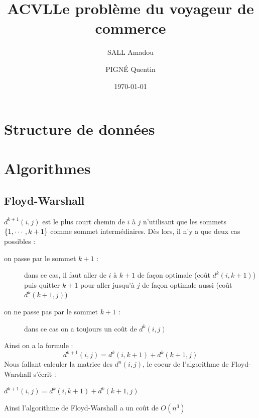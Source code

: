 \documentclass[11pt]{article} \usepackage[top=2cm, bottom=2cm, left=2cm, right=2cm]{geometry}
\title{ACVL} \title{Le problème du voyageur de commerce} \author{SALL Amadou \and PIGN\'E Quentin } \date{\today}
\begin{document}
\maketitle

\section{Structure de données}
\section{Algorithmes}

\subsection*{Floyd-Warshall}
$d^{k+1}(i,j)$ est le plus court chemin de $i$ à $j$ n'utilisant que les sommets $\left\{1,\cdots,k+1\right\}$ comme sommet
intermédiaires. Dès lors, il n'y a que deux cas possibles :
\begin{description}
    \item[on passe par le sommet $k+1$ :]  dans ce cas, il faut aller de $i$ à $k+1$ de façon optimale (coût
  $d^{k}(i,k+1)$) puis quitter $k+1$ pour aller jusqu'à $j$ de façon optimale aussi (coût $d^{k}(k+1,j)$)
\item[on ne passe pas par le sommet $k+1$ :] dans ce cas on a toujours un coût de $d^{k}(i,j)$
\end{description}
Ainsi on a la formule :
\begin{displaymath}
  d^{k+1}(i,j) = d^{k}(i,k+1) + d^{k}(k+1,j) 
\end{displaymath}
Nous fallant calculer la matrice des $d^{n}(i,j)$, le coeur de l'algorithme de Floyd-Warshall s'écrit :
  \begin{algorithmic}[]
           \State $ d^{k+1}(i,j) = d^{k}(i,k+1) + d^{k}(k+1,j) $
           \EndFor
       \EndFor
   \EndFor
  \end{algorithmic}
Ainsi l'algorithme de Floyd-Warshall a un coût de $O(n^3)$
\end{document}
